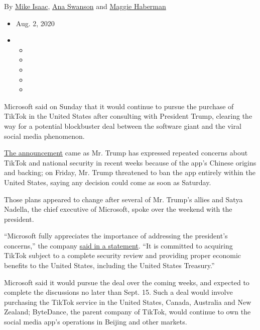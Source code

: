 By \href{https://www.nytimes.com/by/mike-isaac}{Mike Isaac},
\href{https://www.nytimes.com/by/ana-swanson}{Ana Swanson} and
\href{https://www.nytimes.com/by/maggie-haberman}{Maggie Haberman}

\begin{itemize}
\item
  Aug. 2, 2020
\item
  \begin{itemize}
  \item
  \item
  \item
  \item
  \item
  \end{itemize}
\end{itemize}

Microsoft said on Sunday that it would continue to pursue the purchase
of TikTok in the United States after consulting with President Trump,
clearing the way for a potential blockbuster deal between the software
giant and the viral social media phenomenon.

\href{https://blogs.microsoft.com/blog/2020/08/02/microsoft-to-continue-discussions-on-potential-tiktok-purchase-in-the-united-states/}{The
announcement} came as Mr. Trump has expressed repeated concerns about
TikTok and national security in recent weeks because of the app's
Chinese origins and backing; on Friday, Mr. Trump threatened to ban the
app entirely within the United States, saying any decision could come as
soon as Saturday.

Those plans appeared to change after several of Mr. Trump's allies and
Satya Nadella, the chief executive of Microsoft, spoke over the weekend
with the president.

``Microsoft fully appreciates the importance of addressing the
president's concerns,'' the company
\href{https://blogs.microsoft.com/blog/2020/08/02/microsoft-to-continue-discussions-on-potential-tiktok-purchase-in-the-united-states/}{said
in a statement}. ``It is committed to acquiring TikTok subject to a
complete security review and providing proper economic benefits to the
United States, including the United States Treasury.''

Microsoft said it would pursue the deal over the coming weeks, and
expected to complete the discussions no later than Sept. 15. Such a deal
would involve purchasing the TikTok service in the United States,
Canada, Australia and New Zealand; ByteDance, the parent company of
TikTok, would continue to own the social media app's operations in
Beijing and other markets.

